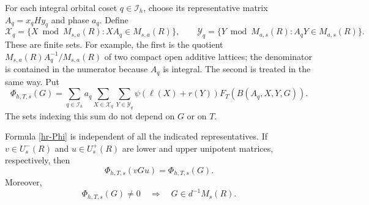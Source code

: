 For each integral orbital coset $q\in\mathcal I_h$, choose its
representative matrix $A_q=x_qHy_q$ and phase $a_q$. Define
\[
 \mathcal X_q=
  \{X\bmod M_{s,a}(R):XA_q\in M_{s,a}(R)\},\qquad
 \mathcal Y_q=
  \{Y\bmod M_{a,s}(R):A_qY\in M_{a,s}(R)\}.
\]
These are finite sets. For example, the first is the quotient
$M_{s,a}(R)A_q^{-1}/M_{s,a}(R)$ of two compact open additive
lattices; the denominator is contained in the numerator because
$A_q$ is integral. The second is treated in the same way. Put
\begin{equation}\label{hr-Phi}
 \Phi_{h,T,s}(G)=
 \sum_{q\in\mathcal I_h}a_q
    \sum_{X\in\mathcal X_q}\sum_{Y\in\mathcal Y_q}
        \psi(\ell(X)+r(Y))F_T(B(A_q,X,Y,G)).
\end{equation}
The sets indexing this sum do not depend on $G$ or on $T$.

\begin{lemma}\label{hr-well-defined}
Formula \eqref{hr-Phi} is independent of all the indicated
representatives. If $v\in U_s^-(R)$ and $u\in U_s^+(R)$ are
lower and upper unipotent matrices, respectively, then
\begin{equation}\label{hr-invariance}
                  \Phi_{h,T,s}(vGu)=\Phi_{h,T,s}(G).
\end{equation}
Moreover,
\begin{equation}\label{hr-support}
 \Phi_{h,T,s}(G)\ne0
       \quad\Longrightarrow\quad G\in d^{-1}M_s(R).
\end{equation}
\end{lemma}

